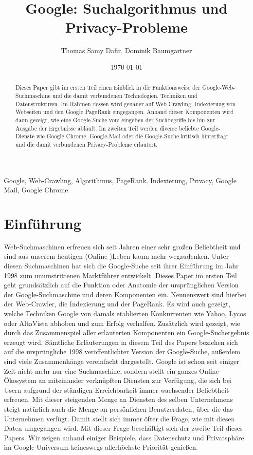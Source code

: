 \documentclass[12pt, a4paper]{llncs}
\title{Google: Suchalgorithmus und Privacy-Probleme}
\author{Thomas Samy Dafir, Dominik Baumgartner}
\institute{Wissenschaftliche Arbeitstechniken und Präsentation,\newline
	Fachbereich Computerwissenschaften,\newline Universität Salzburg}
\date{\selectlanguage{german}\today}
\begin{document}
	\maketitle
	\begin{abstract}
	Dieses Paper gibt im ersten Teil einen Einblick in die Funktionsweise der Google-Web-Suchmaschine und die 
	damit verbundenen Technologien, Techniken und Datenstrukturen. Im Rahmen dessen wird genauer auf Web-Crawling,
	Indexierung von Webseiten und den Google PageRank eingegangen. Anhand dieser Komponenten wird dann gezeigt, wie
	eine Google-Suche vom eingeben der Suchbegriffe bis hin zur Ausgabe der Ergebnisse abläuft.
	Im zweiten Teil werden diverse beliebte Google-Dienste wie Google Chrome, Google-Mail oder die Google-Suche
	kritisch hinterfragt und die damit verbundenen Privacy-Probleme erläutert.
	\end{abstract}
	\begin{small}
		\begin{keywords}
		Google, Web-Crawling, Algorithmus, PageRank, Indexierung, Privacy, Google Mail, Google Chrome
		\end{keywords}
	\end{small}
	
	\section{Einführung}
	Web-Suchmaschinen erfreuen sich seit Jahren einer sehr großen Beliebtheit und sind aus unserem heutigen (Online-)Leben kaum 
	mehr wegzudenken. Unter diesen Suchmaschinen hat sich die Google-Suche seit ihrer Einführung im Jahr 1998 zum 
	unumstrittenen Marktführer entwickelt. Dieses Paper im ersten Teil geht grundsätzlich auf die Funktion oder 
	Anatomie der ursprünglichen Version der Google-Suchmaschine und deren Komponenten ein. Nennenswert sind hierbei 
	der Web-Crawler, die Indexierung und der PageRank. Es wird auch gezeigt, welche Techniken Google von damals	etablierten
	Konkurrenten wie Yahoo, Lycos oder AltaVista abhoben und zum Erfolg verhalfen. Zusätzlich wird gezeigt, wie durch
	das Zusammenspiel aller erläuterten Komponenten ein Google-Suchergebnis erzeugt wird. Sämtliche Erläuterungen in
	diesem Teil des Papers beziehen sich auf die ursprüngliche 1998 veröffentlichter Version der Google-Suche, außerdem 
	sind viele Zusammenhänge vereinfacht dargestellt.\newline
	Google ist schon seit einiger Zeit nicht mehr nur eine Suchmaschine, sondern stellt ein ganzes Online-Ökosystem an
	miteinander verknüpften Diensten zur Verfügung, die sich bei Usern aufgrund der ständigen Erreichbarkeit immer 
	wachsender Beliebtheit erfreuen. Mit dieser steigenden Menge an Diensten des selben Unternehmens steigt natürlich 
	auch die Menge an persönlichen Benutzerdaten, über die das Unternehmen verfügt. Damit stellt sich immer öfter die Frage,
	wie mit diesen Daten umgegangen wird. Mit dieser Frage beschäftigt sich der zweite Teil dieses Papers. Wir zeigen anhand 
	einiger Beispiele, dass Datenschutz und Privatsphäre im Google-Universum keineswegs allerhöchste Priorität genießen.
	
\end{document}
